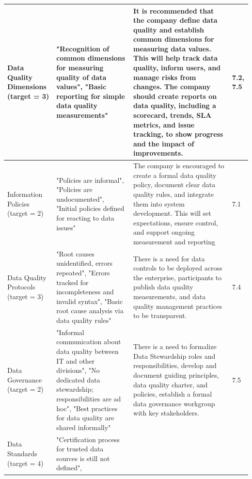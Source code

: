 \documentclass[conference]{IEEEtran}
\begin{document}
\begin{table}[h]
\begin{tabular}{|p{2cm}|p{5cm}|p{5cm}|p{2cm}|}
\hline
Data Quality Dimensions (target = 3) & "Recognition of common dimensions for measuring quality of data values", "Basic reporting for simple data quality measurements" & It is recommended that the company define data quality and establish common dimensions for measuring data values. This will help track data quality, inform users, and manage risks from changes. The company should create reports on data quality, including a scorecard, trends, SLA metrics, and issue tracking, to show progress and the impact of improvements. & 7.2, 7.5 \\
\hline
Information Policies (target = 2) & "Policies are informal", "Policies are undocumented", "Initial policies defined for reacting to data issues" & The company is encouraged to create a formal data quality policy, document clear data quality rules, and integrate them into system development. This will set expectations, ensure control, and support ongoing measurement and reporting & 7.1 \\
\hline
Data Quality Protocols (target = 3) &
"Root causes unidentified, errors repeated", 
"Errors tracked for incompleteness and invalid syntax", 
"Basic root cause analysis via data quality rules"
& 
There is a need for data controls to be deployed across the enterprise, participants to publish data quality measurements, and data quality management practices to be transparent.
& 7.4\\
\hline
Data Governance (target = 2)& 
"Informal communication about data quality between IT and other divisions", 
"No dedicated data stewardship; responsibilities are ad hoc", 
"Best practices for data quality are shared informally"
&
There is a need to formalize Data Stewardship roles and responsibilities, develop and document guiding principles, data quality charter, and policies, establish a formal data governance workgroup with key stakeholders.
& 7.5 \\
\hline
Data Standards (target = 4) & 
"Certification process for trusted data sources is still not defined", 

\end{tabular}
\end{table}
\end{document}
